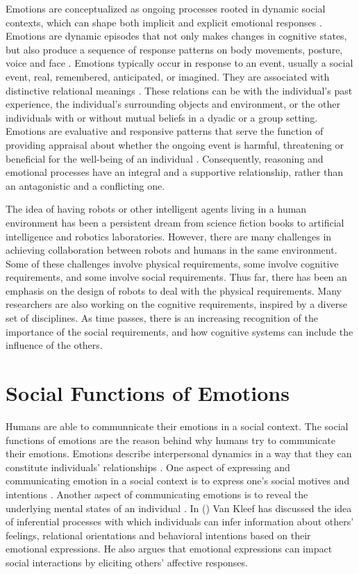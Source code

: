 \documentclass[letterpaper]{article}
\begin{document}
Emotions are conceptualized as ongoing processes rooted in dynamic social
contexts, which can shape both implicit and explicit emotional responses
\cite{parkinson:emotion-social-interaction}. Emotions are dynamic episodes that
not only makes changes in cognitive states, but also produce a sequence of
response patterns on body movements, posture, voice and face
\cite{scherer:expression-appraisal}. Emotions typically occur in response to an
event, usually a social event, real, remembered, anticipated, or imagined. They
are associated with distinctive relational meanings
\cite{parkinson:holds-emotion}. These relations can be with the individual's
past experience, the individual's surrounding objects and environment, or the
other individuals with or without mutual beliefs in a dyadic or a group setting.
Emotions are evaluative and responsive patterns that serve the function of
providing appraisal about whether the ongoing event is harmful, threatening or
beneficial for the well-being of an individual \cite{zhu:emotion-action}.
Consequently, reasoning and emotional processes have an integral and a
supportive relationship, rather than an antagonistic and a conflicting one.

The idea of having robots or other intelligent agents living in a human
environment has been a persistent dream from science fiction books to artificial
intelligence and robotics laboratories. However, there are many challenges in
achieving collaboration between robots and humans in the same environment. Some
of these challenges involve physical requirements, some involve cognitive
requirements, and some involve social requirements. Thus far, there has been an
emphasis on the design of robots to deal with the physical requirements. Many
researchers are also working on the cognitive requirements, inspired by a
diverse set of disciplines. As time passes, there is an increasing recognition
of the importance of the social requirements, and how cognitive systems can
include the influence of the others.

\section{Social Functions of Emotions}

Humans are able to communnicate their emotions in a social context. The social
functions of emotions are the reason behind why humans try to communicate their
emotions. Emotions describe interpersonal dynamics in a way that they can
constitute individuals' relationships
\cite{parkinson:emotions-social,tiedens:social-life}. One aspect of expressing
and communicating emotion in a social context is to express one's social motives
and intentions \cite{hess:darwin-emotion}. Another aspect of communicating
emotions is to reveal the underlying mental states of an individual
\cite{parkinson:emotion-communication}. In
(\citeyear{kleef:emotion-regulate-social}) Van Kleef has discussed the idea of
inferential processes with which individuals can infer information about others'
feelings, relational orientations and behavioral intentions based on their
emotional expressions. He also argues that emotional expressions can impact
social interactions by eliciting others' affective responses.
\end{document}
